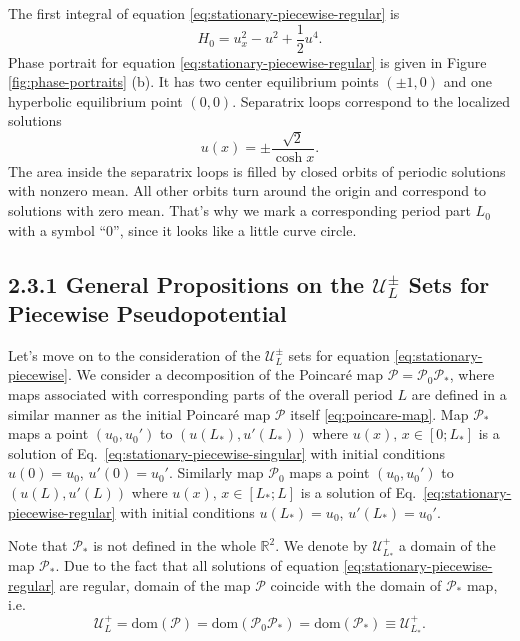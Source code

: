 The first integral of equation \eqref{eq:stationary-piecewise-regular} is
\begin{equation}
	H_0 = u_x^2 - u^2 + \frac{1}{2} u^4.
\label{eq:stationary-piecewise-regular-integral}
\end{equation}
Phase portrait for equation \eqref{eq:stationary-piecewise-regular} is given in Figure \ref{fig:phase-portraits} (b).
It has two center equilibrium points $(\pm 1, 0)$ and one hyperbolic equilibrium point $(0, 0)$.
Separatrix loops correspond to the localized solutions
\begin{equation}
	u(x) = \pm \frac{\sqrt{2}}{\cosh{x}}.
\end{equation}
The area inside the separatrix loops is filled by closed orbits of periodic solutions with nonzero mean.
All other orbits turn around the origin and correspond to solutions with zero mean.
That's why we mark a corresponding period part $L_0$ with a symbol ``$0$'', since it looks like a little curve circle.

\subsection*{2.3.1 General Propositions on the $\mathscr{U}_L^{\pm}$ Sets for Piecewise Pseudopotential}

Let's move on to the consideration of the $\mathscr{U}_L^{\pm}$ sets for equation \eqref{eq:stationary-piecewise}.
We consider a decomposition of the Poincar\'e map $\mathcal{P} = \mathcal{P}_0 \mathcal{P}_*$, where  maps associated with corresponding parts of the overall period $L$ are defined in a similar manner as the initial Poincar\'e map $\mathcal{P}$ itself \eqref{eq:poincare-map}.
Map $\mathcal{P}_*$ maps a point $(u_0, u_0')$ to $(u(L_*), u'(L_*))$ where $u(x), \, x \in [0; L_*]$ is a solution of Eq.~\eqref{eq:stationary-piecewise-singular} with initial conditions $u(0) = u_0$, $u'(0) = u_0'$.
Similarly map $\mathcal{P}_0$ maps a point $(u_0, u_0')$ to $(u(L), u'(L))$ where $u(x), \, x \in [L_*; L]$ is a solution of Eq.~\eqref{eq:stationary-piecewise-regular} with initial conditions $u(L_*) = u_0$, $u'(L_*) = u_0'$.

Note that $\mathcal{P}_*$ is not defined in the whole $\mathbb{R}^2$.
We denote by $\mathscr{U}_{L_*}^+$ a domain of the map $\mathcal{P}_*$.
Due to the fact that all solutions of equation \eqref{eq:stationary-piecewise-regular} are regular, domain of the map $\mathcal{P}$ coincide with the domain of $\mathcal{P}_*$ map, i.e.
\begin{equation}
	\mathscr{U}_L^+ = \textrm{dom}(\mathcal{P}) = \textrm{dom}(\mathcal{P}_0 \mathcal{P}_*) = \textrm{dom}(\mathcal{P}_*) \equiv \mathscr{U}_{L_*}^+.
\end{equation}

